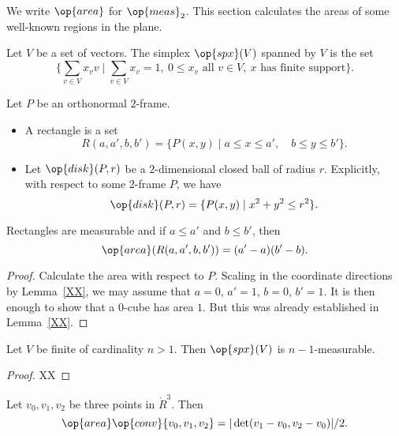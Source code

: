 We write $\op{area}$ for $\op{meas}_2$.  This section calculates the
areas of some well-known regions in the plane.

\begin{definition}  Let $V$ be a set of vectors.  The simplex
$\op{spx}(V)$ spanned by $V$ is the set
    $$\{ \sum_{v\in V} x_v v \mid \sum_{v\in V} x_v = 1,\ 0\le x_v \text{ all } v\in V,
    \ x \text{ has finite support}\}.$$
\end{definition}

\begin{definition}  Let $P$ be an orthonormal $2$-frame.
    \begin{itemize}
    \item A rectangle is a set
    $$R(a,a',b,b') = \{ P(x,y) \mid a \le x \le a',\quad b\le y\le b'\}.$$
    \item Let $\op{disk}(P,r)$
be a $2$-dimensional closed ball of radius $r$.  Explicitly, with
respect to some $2$-frame $P$, we have
    $$
    \op{disk}(P,r) = \{P(x,y) \mid x^2 + y^2 \le r^2\}.
    $$
    \end{itemize}
\end{definition}

\begin{lemma}
Rectangles are measurable and if $a\le a'$ and $b\le b'$, then
    $$\op{area}(R(a,a',b,b')) = (a'-a)(b'-b).$$
\end{lemma}

\begin{proof} Calculate the area with respect to $P$.  Scaling in
the coordinate directions by Lemma~\ref{XX}, we may assume that
$a=0$, $a'=1$, $b=0$, $b'=1$.  It is then enough to show that a
$0$-cube has area $1$.  But this was already established in
Lemma~\ref{XX}.
\end{proof}



\begin{lemma} Let $V$ be finite of cardinality $n>1$.  Then $\op{spx}(V)$ is
$n-1$-measurable.
\end{lemma}

\begin{proof}
XX
\end{proof}

\begin{lemma} Let $v_0,v_1,v_2$ be three points in $\ring{R}^3$.
Then 
    $$
    \op{area}\op{conv}\{v_0,v_1,v_2\} = 
    |\det(v_1-v_0,v_2-v_0)|/2.
    $$
\end{lemma}



